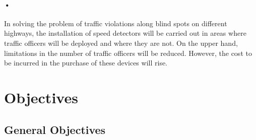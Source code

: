 \documentclass[12pt]{report}
\begin{document}
\paragraph{•}
In solving the problem of traffic violations along blind spots on different highways, the installation of speed detectors will be carried out in areas where traffic officers will be deployed and where they are not. On the upper hand, limitations in the number of traffic officers will be reduced. However, the cost to be incurred in the purchase of these devices will rise. 

\section{Objectives}
\subsection{General Objectives}
\end{document}

